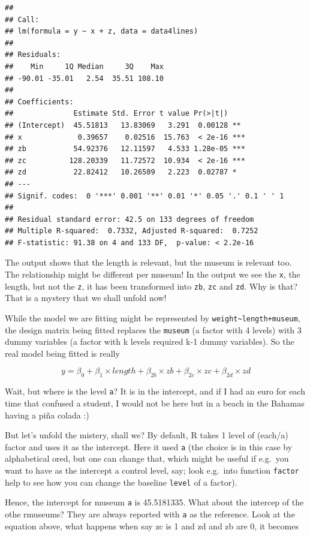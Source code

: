 \documentclass[
]{book}
\begin{document}
\begin{verbatim}
## 
## Call:
## lm(formula = y ~ x + z, data = data4lines)
## 
## Residuals:
##    Min     1Q Median     3Q    Max 
## -90.01 -35.01   2.54  35.51 108.10 
## 
## Coefficients:
##              Estimate Std. Error t value Pr(>|t|)    
## (Intercept)  45.51813   13.83069   3.291  0.00128 ** 
## x             0.39657    0.02516  15.763  < 2e-16 ***
## zb           54.92376   12.11597   4.533 1.28e-05 ***
## zc          128.20339   11.72572  10.934  < 2e-16 ***
## zd           22.82412   10.26509   2.223  0.02787 *  
## ---
## Signif. codes:  0 '***' 0.001 '**' 0.01 '*' 0.05 '.' 0.1 ' ' 1
## 
## Residual standard error: 42.5 on 133 degrees of freedom
## Multiple R-squared:  0.7332, Adjusted R-squared:  0.7252 
## F-statistic: 91.38 on 4 and 133 DF,  p-value: < 2.2e-16
\end{verbatim}

The output shows that the length is relevant, but the museum is relevant too. The relationship might be different per museum! In the output we see the \texttt{x}, the length, but not the \texttt{z}, it has been transformed into \texttt{zb}, \texttt{zc} and \texttt{zd}. Why is that? That is a mystery that we shall unfold now!

While the model we are fitting might be represented by \texttt{weight\textasciitilde{}length+museum}, the design matrix being fitted replaces the \texttt{museum} (a factor with 4 levels) with 3 dummy variables (a factor with k levels required k-1 dummy variables). So the real model being fitted is really

\[y=\beta_0+\beta_1 \times length + \beta_{2b} \times zb + \beta_{2c} \times zc + \beta_{2d} \times zd\]

Wait, but where is the level \texttt{a}? It is in the intercept, and if I had an euro for each time that confused a student, I would not be here but in a beach in the Bahamas having a piña colada :)

But let's unfold the mistery, shall we? By default, R takes 1 level of (each/a) factor and uses it as the intercept. Here it used \texttt{a} (the choice is in this case by alphabetical ored, but one can change that, which might be useful if e.g.~you want to have as the intercept a control level, say; look e.g.~into function \texttt{factor} help to see how you can change the baseline \texttt{level} of a factor).

Hence, the intercept for museum \texttt{a} is 45.5181335. What about the intercep of the othe rmuseums? They are always reported with \texttt{a} as the reference. Look at the equation above, what happens when say zc is 1 and zd and zb are 0, it becomes
\end{document}
